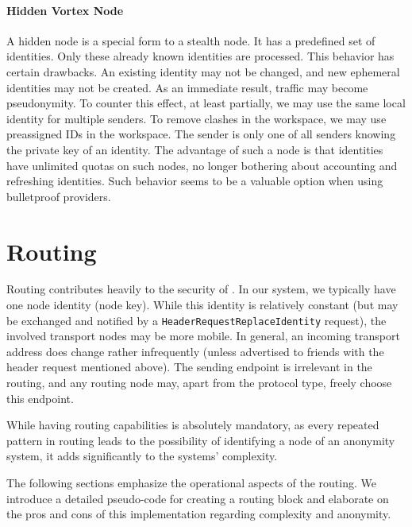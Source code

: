 \subsubsection{Hidden Vortex Node\label{sec:hiddenNode}}
A hidden node is a special form to a stealth node. It has a predefined set of identities. Only these already known identities are processed. This behavior has certain drawbacks. An existing identity may not be changed, and new ephemeral identities may not be created. As an immediate result, traffic may become pseudonymity. To counter this effect, at least partially, we may use the same local identity for multiple senders. To remove clashes in the workspace, we may use preassigned IDs in the workspace. The sender is only one of all senders knowing the private key of an identity. The advantage of such a node is that identities have unlimited quotas on such nodes, no longer bothering about accounting and refreshing identities. Such behavior seems to be a valuable option when using bulletproof providers.

\chapter{Routing}
Routing contributes heavily to the security of \MessageVortex. In our system, we typically have one node identity (node key). While this identity is relatively constant (but may be exchanged and notified by a \texttt{HeaderRequestReplaceIdentity} request), the involved transport nodes may be more mobile. In general, an incoming transport address does change rather infrequently (unless advertised to friends with the header request mentioned above). The sending endpoint is irrelevant in the routing, and any routing node may, apart from the protocol type, freely choose this endpoint. 

While having routing capabilities is absolutely mandatory, as every repeated pattern in routing leads to the possibility of identifying a node of an anonymity system, it adds significantly to the systems' complexity.

The following sections emphasize the operational aspects of the routing. We introduce a detailed pseudo-code for creating a routing block and elaborate on the pros and cons of this implementation regarding complexity and anonymity.

